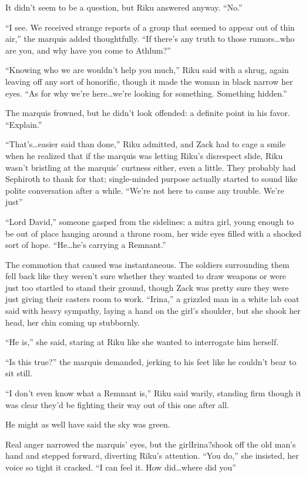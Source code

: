 It didn't seem to be a question, but Riku answered anyway. ``No.''

``I see. We received strange reports of a group that seemed to appear out of thin air,'' the marquis added thoughtfully. ``If there's any truth to those rumors\ldots who are you, and why have you come to Athlum?''

``Knowing who we are wouldn't help you much,'' Riku said with a shrug, again leaving off any sort of honorific, though it made the woman in black narrow her eyes. ``As for why we're here\ldots we're looking for something. Something hidden.''

The marquis frowned, but he didn't look offended: a definite point in his favor. ``Explain.''

``That's\ldots easier said than done,'' Riku admitted, and Zack had to cage a smile when he realized that if the marquis was letting Riku's disrespect slide, Riku wasn't bristling at the marquis' curtness either, even a little. They probably had Sephiroth to thank for that; single-minded purpose actually started to sound like polite conversation after a while. ``We're not here to cause any trouble. We're just\textemdash ''

``Lord David,'' someone gasped from the sidelines: a mitra girl, young enough to be out of place hanging around a throne room, her wide eyes filled with a shocked sort of hope. ``He\ldots he's carrying a Remnant.''

The commotion that caused was instantaneous. The soldiers surrounding them fell back like they weren't sure whether they wanted to draw weapons or were just too startled to stand their ground, though Zack was pretty sure they were just giving their casters room to work. ``Irina,'' a grizzled man in a white lab coat said with heavy sympathy, laying a hand on the girl's shoulder, but she shook her head, her chin coming up stubbornly.

``He is,'' she said, staring at Riku like she wanted to interrogate him herself.

``Is this true?'' the marquis demanded, jerking to his feet like he couldn't bear to sit still.

``I don't even know what a Remnant is,'' Riku said warily, standing firm though it was clear they'd be fighting their way out of this one after all.

He might as well have said the sky was green.

Real anger narrowed the marquis' eyes, but the girl\textemdash Irina?\textemdash shook off the old man's hand and stepped forward, diverting Riku's attention. ``You do,'' she insisted, her voice so tight it cracked. ``I can feel it. How did\ldots where did you\textemdash ''

